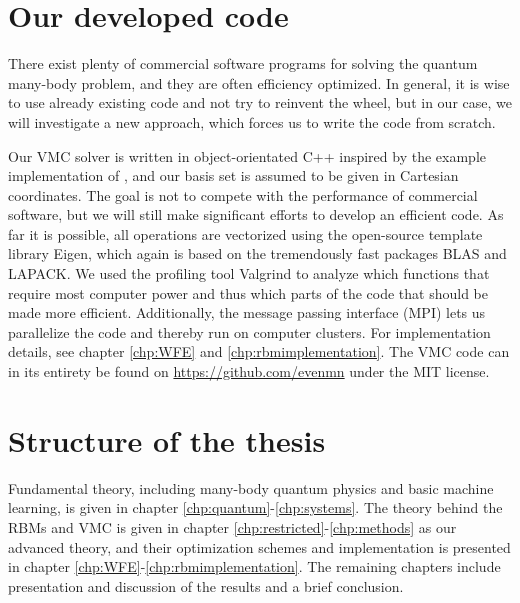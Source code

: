 \section{Our developed code}
There exist plenty of commercial software programs for solving the quantum many-body problem, and they are often efficiency optimized. In general, it is wise to use already existing code and not try to reinvent the wheel, but in our case, we will investigate a new approach, which forces us to write the code from scratch. 

Our VMC solver is written in object-orientated C++ inspired by the example implementation of \citet{ledum_simple_2016}, and our basis set is assumed to be given in Cartesian coordinates. The goal is not to compete with the performance of commercial software, but we will still make significant efforts to develop an efficient code. As far it is possible, all operations are vectorized using the open-source template library Eigen, which again is based on the tremendously fast packages BLAS and LAPACK. We used the profiling tool Valgrind to analyze which functions that require most computer power and thus which parts of the code that should be made more efficient. Additionally, the message passing interface (MPI) lets us parallelize the code and thereby run on computer clusters. For implementation details, see chapter \ref{chp:WFE} and \ref{chp:rbmimplementation}. The VMC code can in its entirety be found on \url{https://github.com/evenmn} under the MIT license. 

\section{Structure of the thesis}
Fundamental theory, including many-body quantum physics and basic machine learning, is given in chapter \ref{chp:quantum}-\ref{chp:systems}. The theory behind the RBMs and VMC is given in chapter \ref{chp:restricted}-\ref{chp:methods} as our advanced theory, and their optimization schemes and implementation is presented in chapter \ref{chp:WFE}-\ref{chp:rbmimplementation}. The remaining chapters include presentation and discussion of the results and a brief conclusion.
